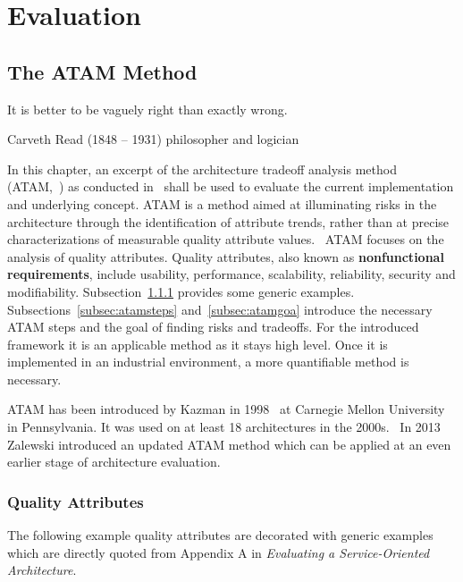 \chapter{Evaluation\label{cha:chapter6}}

\section{The ATAM Method}
\epigraph{It is better to be vaguely right than exactly wrong.}{Carveth Read (1848 – 1931) philosopher and logician}
In this chapter, an excerpt of the architecture tradeoff analysis method (ATAM,~\cite{Kazman2000ATAMEvaluation}) as conducted in~\cite{Bianco2007EvaluatingArchitecture} shall be used to evaluate the current implementation and underlying concept. ATAM is a method aimed at illuminating risks in the architecture through the identification of attribute trends, rather than at precise characterizations of measurable quality attribute values.~\cite{Kazman2008ExperienceAnalysis} ATAM focuses on the analysis of quality attributes. Quality attributes, also known as \textbf{nonfunctional requirements}, include usability, performance, scalability, reliability, security and modifiability. Subsection~\ref{subseb:qualatt} provides some generic examples. Subsections~\ref{subsec:atamsteps} and~\ref{subsec:atamgoa} introduce the necessary ATAM steps and the goal of finding risks and tradeoffs. For the introduced framework it is an applicable method as it stays high level. Once it is implemented in an industrial environment, a more quantifiable method is necessary.  

ATAM has been introduced by Kazman in 1998~\cite{Kazman1998TheMethod} at Carnegie Mellon University in Pennsylvania. It was used on at least 18 architectures in the 2000s.~\cite{Bass2007RiskEvaluations} In 2013 Zalewski introduced an updated ATAM method which can be applied at an even earlier stage of architecture evaluation.~\cite{Zalewski2013BeyondSystems}

\subsection{Quality Attributes}
\label{subseb:qualatt}
The following example quality attributes are decorated with generic examples which are directly quoted from Appendix A in \textit{Evaluating a Service-Oriented Architecture}.~\cite{Bianco2007EvaluatingArchitecture} 
